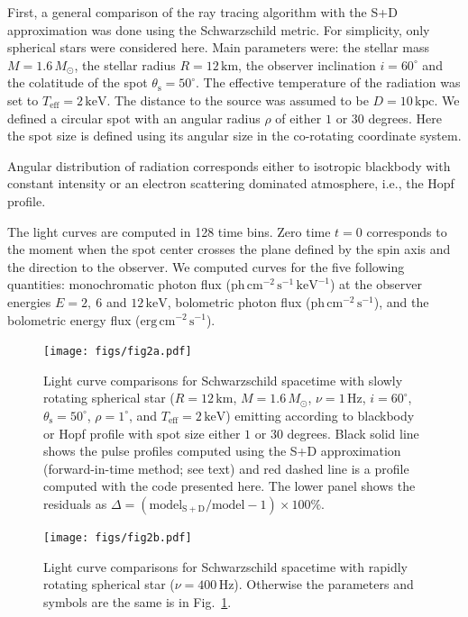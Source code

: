 \documentclass{aa}
\newcommand{\refe}[1]{#1}
\newcommand{\refedel}[1]{}
\newcommand{\sch}{Schwarzschild }
\newcommand{\Msun}{\ensuremath{M_{\odot}}}
\begin{document}
First, a general comparison of the ray tracing algorithm with the S+D approximation was done \refe{using the \sch metric.}
For simplicity, only spherical stars were considered here.
Main parameters were: the stellar mass $M = 1.6\,\Msun$, the stellar radius $R = 12\,\mathrm{km}$, the observer inclination $i = 60^{\circ}$ and the colatitude of the spot $\theta_{\mathrm{s}} = 50^{\circ}$.  
The effective temperature of the radiation was set to $T_{\mathrm{eff}} = 2\,\mathrm{keV}$.  
The distance to the source was assumed to be $D = 10\,\mathrm{kpc}$.  
We defined a circular spot with an angular radius $\rho$ of either $1$ or $30$ degrees.
Here the spot size is defined using its angular size \refe{in the co-rotating coordinate system.}
\refedel{Hence, the spot size is measured using the \textit{angular} size, not the \textit{spatial} size.}
Angular distribution of radiation corresponds either to isotropic blackbody with constant intensity or an electron scattering dominated atmosphere, i.e., the Hopf profile.


The light curves are computed in 128 time bins.  Zero time $t = 0$ corresponds to the moment when the spot center crosses the plane defined by the spin axis and the direction to the observer.  
We computed curves for the five following quantities: monochromatic photon flux ($\mathrm{ph}\,\mathrm{cm}^{-2}\,\mathrm{s}^{-1}\,\mathrm{keV}^{-1}$) at the observer energies $E = 2,~6$ and $12\,\mathrm{keV}$, bolometric photon flux ($\mathrm{ph}\,\mathrm{cm}^{-2}\,\mathrm{s}^{-1}$), and the bolometric energy flux ($\mathrm{erg}\,\mathrm{cm}^{-2}\,\mathrm{s}^{-1}$).


\begin{figure}
\centering
\texttt{[image: figs/fig2a.pdf]}
\caption{\label{fig:sch_comp1}
  Light curve comparisons for \sch spacetime with slowly rotating spherical star ($R = 12\,\mathrm{km}$, $M = 1.6\,\Msun$, $\nu = 1\,\mathrm{Hz}$, $i = 60^{\circ}$, $\theta_{\mathrm{s}} = 50^{\circ}$, $\rho = 1^{\circ}$, and $T_{\mathrm{eff}} = 2\,\mathrm{keV}$) emitting according to blackbody or Hopf profile with spot size either $1$ or $30$ degrees.
    Black solid line shows the pulse profiles computed using the S+D approximation \refe{(forward-in-time method; see text)} and red dashed line is a profile computed with the code presented here.
  The lower panel shows the residuals as $\Delta = (\mathrm{model_{S+D}}/\mathrm{model} -1) \times 100\%$.
}
\end{figure}

\begin{figure}
\centering
\texttt{[image: figs/fig2b.pdf]}
\caption{\label{fig:sch_comp400}
  Light curve comparisons for \sch spacetime with rapidly rotating spherical star ($\nu = 400\,\mathrm{Hz}$).
  Otherwise the parameters and symbols are the same is in Fig.~\ref{fig:sch_comp1}.
}
\end{figure}
\end{document}
